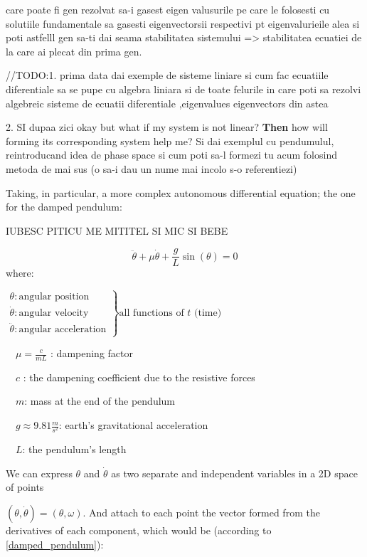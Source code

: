 care poate fi gen rezolvat sa-i gasest eigen valusurile pe care le folosesti cu solutiile fundamentale sa gasesti eigenvectorsii respectivi pt eigenvalurieile alea si poti astfelll gen sa-ti dai seama stabilitatea sistemului => stabilitatea ecuatiei de la care ai plecat din prima gen.

//TODO:1. prima data dai exemple de sisteme liniare si cum fac ecuatiile diferentiale sa se pupe cu algebra liniara si de toate felurile in care poti sa rezolvi algebreic sisteme de ecuatii diferentiale ,eigenvalues eigenvectors din astea \par
2. SI dupaa zici okay but what if my system is not linear? \textbf{Then} how will forming its corresponding system help me? Si dai exemplul cu pendumulul, reintroducand idea de phase space si cum poti sa-l formezi tu acum folosind metoda de mai sus (o sa-i dau un nume mai incolo s-o referentiezi)

Taking, in particular, a more complex autonomous differential equation; the one for the damped pendulum:

IUBESC PITICU ME MITITEL SI MIC SI BEBE

\begin{equation}\label{damped_pendulum}
  \ddot{\theta} +\mu\dot{\theta} + \frac{g}{L}\sin(\theta) = 0
\end{equation}
where:  \par
$
\left.
\begin{array}{l}
  \theta : \text{angular position}       \\
  \dot{\theta} : \text{angular velocity} \\
  \ddot{\theta} : \text{angular acceleration}
\end{array}
\right\}
\text{all functions of } t \text{ (time)}
$

\ \ $\mu = \frac{c}{mL}$ : dampening factor \par
\ \ $c$ : the dampening coefficient due to the resistive forces \par
\ \ $m$: mass at the end of the pendulum \par
\ \ $g \approx 9.81 \frac{m}{s^2}$: earth's gravitational acceleration \par
\ \ $L$: the pendulum's length \par

We can express $\theta$ and $\dot{\theta}$ as two separate and independent variables in a 2D space of points \par $(\theta,\dot{\theta}) = (\theta,\omega)$.
And attach to each point the vector formed from the derivatives of each component, which would be (according to \ref{damped_pendulum}):

